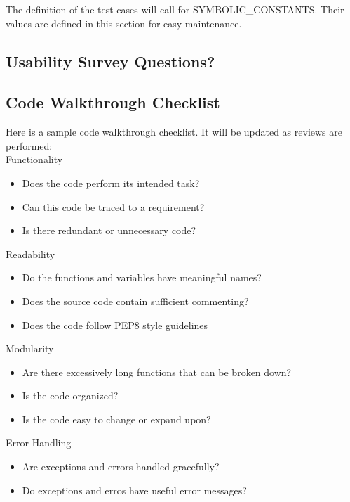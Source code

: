 \documentclass[12pt, titlepage]{article}
\begin{document}
The definition of the test cases will call for SYMBOLIC\_CONSTANTS.
Their values are defined in this section for easy maintenance.

\subsection{Usability Survey Questions?}


\subsection{Code Walkthrough Checklist}
\label{A-Code-walkthrough-checklist}
Here is a sample code walkthrough checklist. It will be updated as reviews are performed:\\

\noindent
Functionality
\begin{itemize}[label=$\square$]
  \item Does the code perform its intended task?
  \item Can this code be traced to a requirement?
  \item Is there redundant or unnecessary code?
\end{itemize}

\noindent
Readability
\begin{itemize}[label=$\square$]
  \item Do the functions and variables have meaningful names?
  \item Does the source code contain sufficient commenting?
  \item Does the code follow PEP8 style guidelines
\end{itemize}

\noindent
Modularity
\begin{itemize}[label=$\square$]
  \item Are there excessively long functions that can be broken down?
  \item Is the code organized? 
  \item Is the code easy to change or expand upon?
\end{itemize}

\noindent
Error Handling
\begin{itemize}[label=$\square$]
  \item Are exceptions and errors handled gracefully?
  \item Do exceptions and erros have useful error messages? 
\end{itemize}
\end{document}
